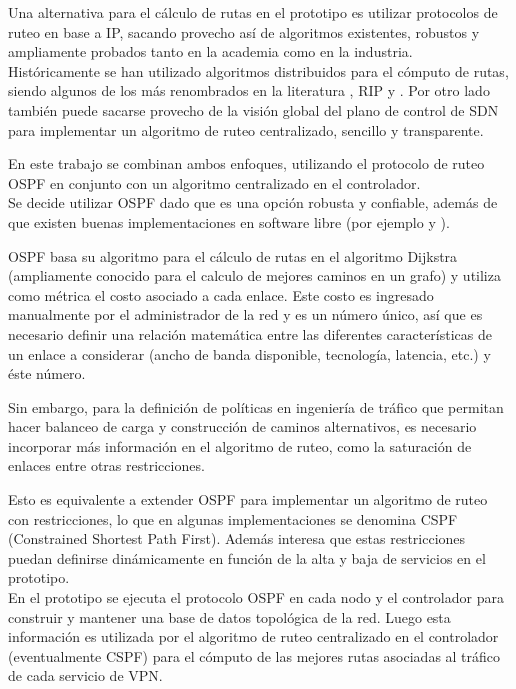 Una alternativa para el c\'alculo de rutas en el prototipo es utilizar protocolos de ruteo en base a IP, sacando provecho as\'i de algoritmos existentes, robustos y ampliamente probados tanto en la academia como en la industria.\\

Hist\'oricamente se han utilizado algoritmos distribuidos para el c\'omputo de rutas, siendo algunos de los m\'as renombrados en la literatura \cite{moy1998rfc}, RIP\cite{malkin1994rip} y \cite{routingprotocol}. Por otro lado también puede sacarse provecho de la visi\'on global del plano de control de SDN para implementar un algoritmo de ruteo centralizado, sencillo y transparente.

En este trabajo se combinan ambos enfoques, utilizando el protocolo de ruteo OSPF en conjunto con un algoritmo centralizado en el controlador.\\

Se decide utilizar OSPF dado que es una opción robusta y confiable, adem\'as de que existen buenas implementaciones en software libre (por ejemplo \cite{Quagga} y \cite{BIRD}).

OSPF basa su algoritmo para el c\'alculo de rutas en el algoritmo Dijkstra (ampliamente conocido para el calculo de mejores caminos en un grafo) y utiliza como m\'etrica el costo asociado a cada enlace. Este costo es ingresado manualmente por el administrador de la red y es un n\'umero \'unico, as\'i que es necesario definir una relaci\'on matem\'atica entre las diferentes caracter\'isticas de un enlace a considerar (ancho de banda disponible, tecnolog\'ia, latencia, etc.) y \'este n\'umero.

Sin embargo, para la definición de políticas en ingeniería de tr\'afico que permitan hacer balanceo de carga y construcción de caminos alternativos, es necesario incorporar m\'as informaci\'on en el algoritmo de ruteo, como la saturaci\'on de enlaces entre otras restricciones.

Esto es equivalente a extender OSPF para implementar un algoritmo de ruteo con restricciones, lo que en algunas implementaciones se denomina CSPF (Constrained Shortest Path First). Adem\'as interesa que estas restricciones puedan definirse din\'amicamente en función de la alta y baja de servicios en el prototipo.\\

En el prototipo se ejecuta el protocolo OSPF en cada nodo y el controlador para construir y mantener una base de datos topol\'ogica de la red. Luego esta información es utilizada por el algoritmo de ruteo centralizado en el controlador (eventualmente CSPF) para el c\'omputo de las mejores rutas asociadas al tr\'afico de cada servicio de VPN.\\

